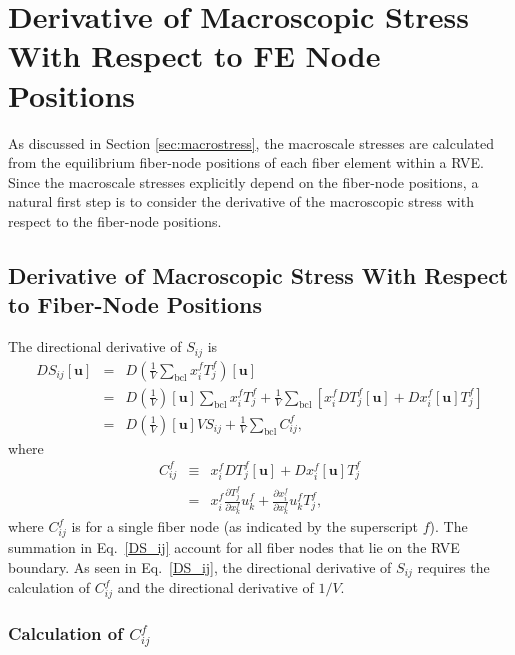 \documentclass[12pt,aps,pre]{revtex4}
\begin{document}
\section{Derivative of Macroscopic Stress With Respect to FE Node Positions}

As discussed in Section \ref{sec:macrostress}, the macroscale stresses are calculated from the equilibrium fiber-node positions of each fiber element within a RVE. Since the macroscale stresses explicitly depend on the fiber-node positions, a natural first step is to consider the derivative of the macroscopic stress with respect to the fiber-node positions.

\subsection{Derivative of Macroscopic Stress With Respect to Fiber-Node Positions}

The directional derivative of $S_{ij}$ is
%
\begin{eqnarray}
DS_{ij}[\textbf{u}] &=& D\left( \frac{1}{V} \sum_{\text{bcl}} x_i^f T_j^f \right)[\textbf{u}] \nonumber\\
%
&=& D \left(\frac{1}{V}\right) [\textbf{u}]\sum_{\text{bcl}} x_i^f T_j^f + \frac{1}{V} \sum_{\text{bcl}} \left[ x_i^f D T_j^f[\textbf{u}] + D x_i^f  [\textbf{u}]  T_j^f \right]\nonumber\\
%
&=& D \left(\frac{1}{V}\right) [\textbf{u}] V S_{ij} + \frac{1}{V} \sum_{\text{bcl}}  C_{ij}^f,
\label{DS_ij}
\end{eqnarray}
%
where 
%
\begin{eqnarray}
C_{ij}^f &\equiv&   x_i^f D T_j^f[\textbf{u}] + D x_i^f  [\textbf{u}]  T_j^f \nonumber\\
&=& x_i^f \frac{\partial T_j^f}{\partial x_k^f} u_k^f + \frac{\partial x_i^f}{\partial x_k^f}u_k^f T_j^f ,
\label{C_ij}
\end{eqnarray}
%
where $C_{ij}^f$ is for a single fiber node (as indicated by the superscript $f$). The summation in Eq.\ \eqref{DS_ij} account for all fiber nodes that lie on the RVE boundary. As seen in Eq.\ \eqref{DS_ij}, the directional derivative of $S_{ij}$ requires the calculation of $C_{ij}^f$ and the directional derivative of $1/V$. 

\subsubsection{Calculation of $C_{ij}^f$}
\end{document}
